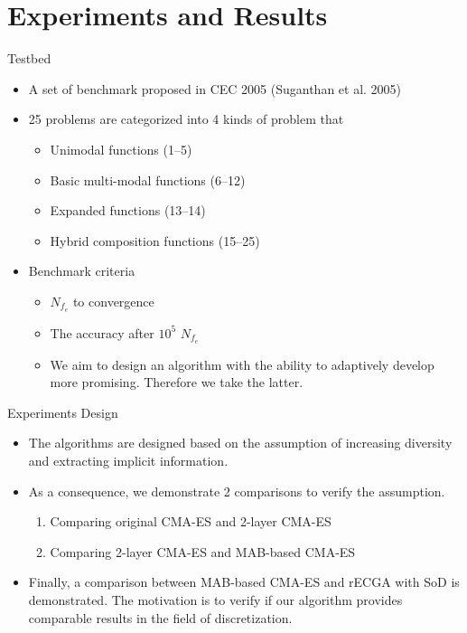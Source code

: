 \section{Experiments and Results}

\begin{frame}{Testbed}
  \begin{itemize}
    \item A set of benchmark proposed in CEC 2005 (Suganthan et al. 2005) 
      \vspace*{14pt}
    \item 25 problems are categorized into 4 kinds of problem that
      \begin{itemize}
        \item Unimodal functions (1--5)
        \item Basic multi-modal functions (6--12)
        \item Expanded functions (13--14)
        \item Hybrid composition functions (15--25)
      \end{itemize}
      \vspace*{14pt}
    \item Benchmark criteria
      \begin{itemize}
        \item $N_{f_e}$ to convergence
        \item The accuracy after $10^5$ $N_{f_e}$ 
        \item We aim to design an algorithm with the ability to adaptively
          develop more promising. Therefore we take the latter.
      \end{itemize}
  \end{itemize}
\end{frame}

\begin{frame}{Experiments Design}
  \begin{itemize}
    \item The algorithms are designed based on the assumption of
      increasing diversity and extracting implicit information.
      \vspace*{14pt}
    \item As a consequence, we demonstrate 2 comparisons to verify the
      assumption.
      \begin{enumerate}
        \item Comparing original CMA-ES and  2-layer CMA-ES
        \item Comparing 2-layer CMA-ES and MAB-based CMA-ES
      \end{enumerate}
      \vspace*{14pt}
    \item Finally, a comparison between MAB-based CMA-ES and rECGA with
      SoD is demonstrated. The motivation is to verify if our algorithm
      provides comparable results in the field of discretization.
  \end{itemize}
\end{frame}

